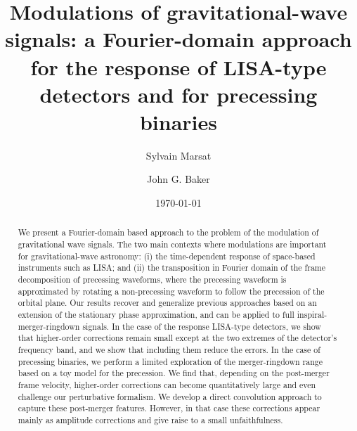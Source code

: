 \documentclass[aps,showpacs,%
prd,superscriptaddress,nofootinbib]{revtex4}
\begin{document}
\title{Modulations of gravitational-wave signals: a Fourier-domain approach for the response of LISA-type detectors and for precessing binaries}

\author{Sylvain Marsat}
\author{John G. Baker}


\date{\today}

\begin{abstract}

We present a Fourier-domain based approach to the problem of the modulation of gravitational wave signals. The two main contexts where modulations are important for gravitational-wave astronomy: (i) the time-dependent response of space-based instruments such as LISA; and (ii) the transposition in Fourier domain of the frame decomposition of precessing waveforms, where the precessing waveform is approximated by rotating a non-precessing waveform to follow the precession of the orbital plane. Our results recover and generalize previous approaches based on an extension of the stationary phase approximation, and can be applied to full inspiral-merger-ringdown signals. In the case of the response LISA-type detectors, we show that higher-order corrections remain small except at the two extremes of the detector's frequency band, and we show that including them reduce the errors. In the case of precessing binaries, we perform a limited exploration of the merger-ringdown range based on a toy model for the precession. We find that, depending on the post-merger frame velocity, higher-order corrections can become quantitatively large and even challenge our perturbative formalism. We develop a direct convolution approach to capture these post-merger features. However, in that case these corrections appear mainly as amplitude corrections and give raise to a small unfaithfulness.

\end{abstract}


\maketitle
\end{document}
